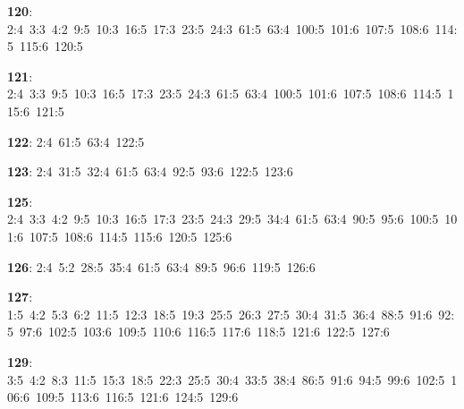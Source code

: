 \noindent \textbf{120}: 2:4\allowbreak\ 3:3\allowbreak\ 4:2\allowbreak\ 9:5\allowbreak\ 10:3\allowbreak\ 16:5\allowbreak\ 17:3\allowbreak\ 23:5\allowbreak\ 24:3\allowbreak\ 61:5\allowbreak\ 63:4\allowbreak\ 100:5\allowbreak\ 101:6\allowbreak\ 107:5\allowbreak\ 108:6\allowbreak\ 114:5\allowbreak\ 115:6\allowbreak\ 120:5\par
\noindent \textbf{121}: 2:4\allowbreak\ 3:3\allowbreak\ 9:5\allowbreak\ 10:3\allowbreak\ 16:5\allowbreak\ 17:3\allowbreak\ 23:5\allowbreak\ 24:3\allowbreak\ 61:5\allowbreak\ 63:4\allowbreak\ 100:5\allowbreak\ 101:6\allowbreak\ 107:5\allowbreak\ 108:6\allowbreak\ 114:5\allowbreak\ 115:6\allowbreak\ 121:5\par
\noindent \textbf{122}: 2:4\allowbreak\ 61:5\allowbreak\ 63:4\allowbreak\ 122:5\par
\noindent \textbf{123}: 2:4\allowbreak\ 31:5\allowbreak\ 32:4\allowbreak\ 61:5\allowbreak\ 63:4\allowbreak\ 92:5\allowbreak\ 93:6\allowbreak\ 122:5\allowbreak\ 123:6\par
\noindent \textbf{125}: 2:4\allowbreak\ 3:3\allowbreak\ 4:2\allowbreak\ 9:5\allowbreak\ 10:3\allowbreak\ 16:5\allowbreak\ 17:3\allowbreak\ 23:5\allowbreak\ 24:3\allowbreak\ 29:5\allowbreak\ 34:4\allowbreak\ 61:5\allowbreak\ 63:4\allowbreak\ 90:5\allowbreak\ 95:6\allowbreak\ 100:5\allowbreak\ 101:6\allowbreak\ 107:5\allowbreak\ 108:6\allowbreak\ 114:5\allowbreak\ 115:6\allowbreak\ 120:5\allowbreak\ 125:6\par
\noindent \textbf{126}: 2:4\allowbreak\ 5:2\allowbreak\ 28:5\allowbreak\ 35:4\allowbreak\ 61:5\allowbreak\ 63:4\allowbreak\ 89:5\allowbreak\ 96:6\allowbreak\ 119:5\allowbreak\ 126:6\par
\noindent \textbf{127}: 1:5\allowbreak\ 4:2\allowbreak\ 5:3\allowbreak\ 6:2\allowbreak\ 11:5\allowbreak\ 12:3\allowbreak\ 18:5\allowbreak\ 19:3\allowbreak\ 25:5\allowbreak\ 26:3\allowbreak\ 27:5\allowbreak\ 30:4\allowbreak\ 31:5\allowbreak\ 36:4\allowbreak\ 88:5\allowbreak\ 91:6\allowbreak\ 92:5\allowbreak\ 97:6\allowbreak\ 102:5\allowbreak\ 103:6\allowbreak\ 109:5\allowbreak\ 110:6\allowbreak\ 116:5\allowbreak\ 117:6\allowbreak\ 118:5\allowbreak\ 121:6\allowbreak\ 122:5\allowbreak\ 127:6\par
\noindent \textbf{129}: 3:5\allowbreak\ 4:2\allowbreak\ 8:3\allowbreak\ 11:5\allowbreak\ 15:3\allowbreak\ 18:5\allowbreak\ 22:3\allowbreak\ 25:5\allowbreak\ 30:4\allowbreak\ 33:5\allowbreak\ 38:4\allowbreak\ 86:5\allowbreak\ 91:6\allowbreak\ 94:5\allowbreak\ 99:6\allowbreak\ 102:5\allowbreak\ 106:6\allowbreak\ 109:5\allowbreak\ 113:6\allowbreak\ 116:5\allowbreak\ 121:6\allowbreak\ 124:5\allowbreak\ 129:6\par
